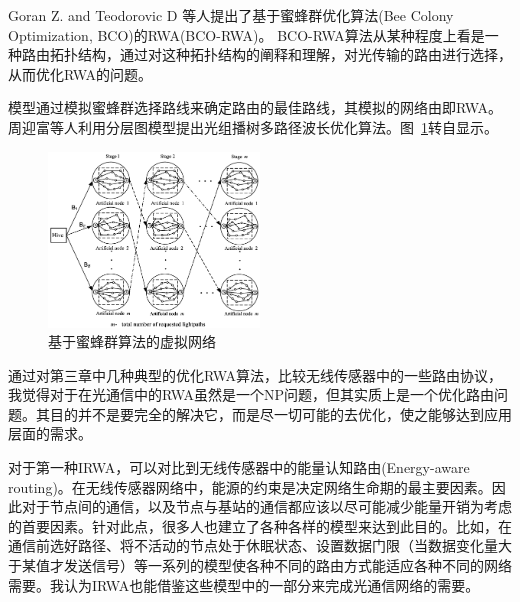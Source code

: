 \documentclass[11pt,twocolumn]{ctexart}
\begin{document}
Goran Z. and Teodorovic D 等人提出了基于蜜蜂群优化算法(Bee Colony Optimization, BCO)的RWA(BCO-RWA)。\cite{6} BCO-RWA算法从某种程度上看是一种路由拓扑结构，通过对这种拓扑结构的阐释和理解，对光传输的路由进行选择，从而优化RWA的问题。

模型通过模拟蜜蜂群选择路线来确定路由的最佳路线，其模拟的网络由即RWA。周迎富等人利用分层图模型提出光组播树多路径波长优化算法。图~\ref{BCO}转自\cite{6}显示。
\begin{figure}[!hbtp]
  \begin{center}
  \includegraphics[width=0.5\textwidth]{BCO}
  \end{center}
  \caption{基于蜜蜂群算法的虚拟网络}
  \label{BCO}
\end{figure}


通过对第三章中几种典型的优化RWA算法，比较无线传感器中的一些路由协议，我觉得对于在光通信中的RWA虽然是一个NP问题，但其实质上是一个优化路由问题。其目的并不是要完全的解决它，而是尽一切可能的去优化，使之能够达到应用层面的需求。

对于第一种IRWA，可以对比到无线传感器中的能量认知路由(Energy-aware routing)。在无线传感器网络中，能源的约束是决定网络生命期的最主要因素。因此对于节点间的通信，以及节点与基站的通信都应该以尽可能减少能量开销为考虑的首要因素。针对此点，很多人也建立了各种各样的模型来达到此目的。比如，在通信前选好路径、将不活动的节点处于休眠状态、设置数据门限（当数据变化量大于某值才发送信号）等一系列的模型使各种不同的路由方式能适应各种不同的网络需要。我认为IRWA也能借鉴这些模型中的一部分来完成光通信网络的需要。
\end{document}
